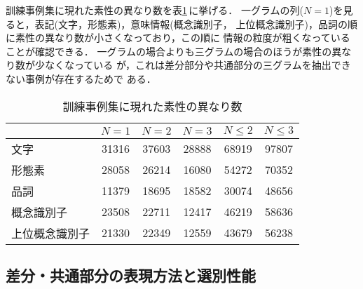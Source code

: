 訓練事例集に現れた素性の異なり数を表\ref{tab:num_of_feats}\,に挙げる．
一グラムの列($N = 1$)を見ると，表記(文字，形態素)，意味情報(概念識別子，
上位概念識別子)，品詞の順に素性の異なり数が小さくなっており，この順に
情報の粒度が粗くなっていることが確認できる．
一グラムの場合よりも三グラムの場合のほうが素性の異なり数が少なくなっている
が，これは差分部分や共通部分の三グラムを抽出できない事例が存在するためで
ある．
\begin{table}[htbp]
\caption{訓練事例集に現れた素性の異なり数}
\label{tab:num_of_feats}
\begin{center}
\begin{tabular}{|l|c|c|c|c|c|}\hline
& $N = 1$ & $N = 2$ & $N = 3$ & $N \le 2$ & $N \le 3$ \\\hline
文字           & 31316 & 37603 & 28888 & 68919 & 97807 \\
形態素         & 28058 & 26214 & 16080 & 54272 & 70352 \\
品詞           & 11379 & 18695 & 18582 & 30074 & 48656 \\
概念識別子     & 23508 & 22711 & 12417 & 46219 & 58636 \\
上位概念識別子 & 21330 & 22349 & 12559 & 43679 & 56238 \\\hline
\end{tabular}
\end{center}
\end{table}


\subsection{差分・共通部分の表現方法と選別性能}
\label{sec:experiment:performance_feats}

